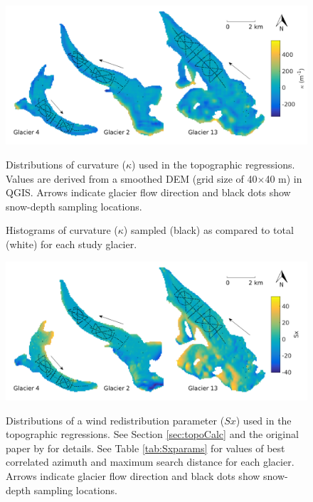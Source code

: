 \documentclass{sfuthesis}
\newcommand{\topomap}{Arrows indicate glacier flow direction and black dots show snow-depth sampling locations. }
\begin{document}
\begin{figure}[H]
	\centering
	\includegraphics[width=\textwidth]{Map_curvature.png}\\
	\caption[Distributions of curvature ($\kappa$)]{Distributions of curvature ($\kappa$) used in the topographic regressions. Values are derived from a smoothed DEM (grid size of 40$\times$40 m) in QGIS. \topomap}
	\label{map:curvature}
\end{figure}

\begin{figure}[H]
	\caption[Histograms of full and sampled curvature ($\kappa$) ]{Histograms of curvature ($\kappa$) sampled (black) as compared to total (white) for each study glacier.}
	\label{sampledRange:curvature}
\end{figure}

\begin{figure}[H]
	\centering
	\includegraphics[width=\textwidth]{Map_Sx.png}\\
	\caption[Distributions of a wind redistribution parameter ($Sx$)]{Distributions of a wind redistribution parameter ($Sx$) used in the topographic regressions. See Section \ref{sec:topoCalc} and the original paper by \cite{Winstral2002} for details. See Table \ref{tab:Sxparams} for values of best correlated azimuth and maximum search distance for each glacier. \topomap }
	\label{map:Sx}
\end{figure}
\end{document}
